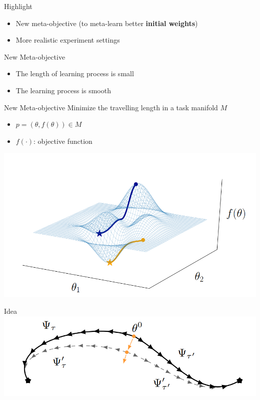 \documentclass{beamer}
\begin{document}
\begin{frame}{Highlight}
  \begin{itemize}
    \item New meta-objective (to meta-learn better \textbf{initial weights})
    \item More realistic experiment settings
  \end{itemize}
\end{frame}

\begin{frame}{New Meta-objective}
  \begin{itemize}
    \item The length of learning process is small
    \item The learning process is smooth
  \end{itemize}

\end{frame}

\begin{frame}{New Meta-objective}
  Minimize the travelling length in a task manifold $M$

  \begin{itemize}
    \item $p = (\theta,f(\theta)) \in M$
    \item $f(\cdot)$: objective function
  \end{itemize}
  \center \includegraphics[width=0.7 \textwidth]{fig/p1-manifold.png}
\end{frame}

\begin{frame}{Idea}
\center \includegraphics[width = \textwidth]{fig/p1-idea.png}
\end{frame}
\end{document}
